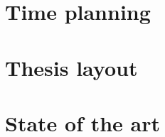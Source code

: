 \section{Time planning}
\label{sec:time-planning}


\section{Thesis layout}
\label{sec:layout}


\section{State of the art}
\label{chap:sota}


\cleardoublepage

\cleardoublepage